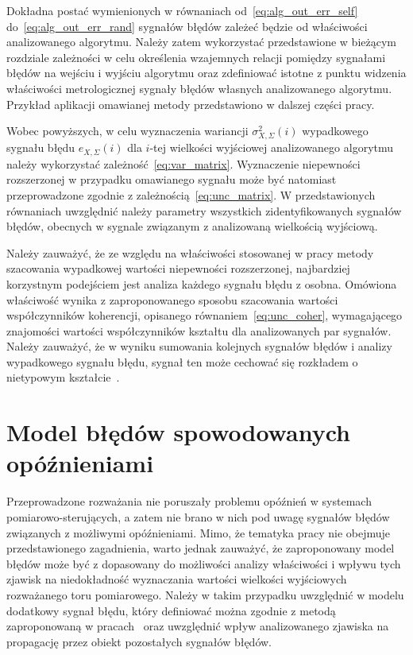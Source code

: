 Dokładna postać wymienionych w równaniach od~\eqref{eq:alg_out_err_self} do~\eqref{eq:alg_out_err_rand} sygnałów błędów zależeć będzie od właściwości analizowanego algorytmu. Należy zatem wykorzystać przedstawione w bieżącym rozdziale zależności w celu określenia wzajemnych relacji pomiędzy sygnałami błędów na wejściu i wyjściu algorytmu oraz zdefiniować istotne z punktu widzenia właściwości metrologicznej sygnały błędów własnych analizowanego algorytmu. Przykład aplikacji omawianej metody przedstawiono w dalszej części pracy.

Wobec powyższych, w celu wyznaczenia wariancji $\sigma_{X,\Sigma}^{2}(i)$ wypadkowego sygnału błędu $e_{X,\Sigma}(i)$ dla $i$-tej wielkości wyjściowej analizowanego algorytmu należy wykorzystać zależność~\eqref{eq:var_matrix}. Wyznaczenie niepewności rozszerzonej w przypadku omawianego sygnału może być natomiast przeprowadzone zgodnie z zależnością~\eqref{eq:unc_matrix}. W przedstawionych równaniach uwzględnić należy parametry wszystkich zidentyfikowanych sygnałów błędów, obecnych w sygnale związanym z analizowaną wielkością wyjściową.

Należy zauważyć, że ze względu na właściwości stosowanej w pracy metody szacowania wypadkowej wartości niepewności rozszerzonej, najbardziej korzystnym podejściem jest analiza każdego sygnału błędu z osobna. Omówiona właściwość wynika z zaproponowanego sposobu szacowania wartości współczynników koherencji, opisanego równaniem~\eqref{eq:unc_coher}, wymagającego znajomości wartości współczynników kształtu dla analizowanych par sygnałów. Należy zauważyć, że w wyniku sumowania kolejnych sygnałów błędów i analizy wypadkowego sygnału błędu, sygnał ten może cechować się rozkładem o nietypowym kształcie~\cite{auth_electronics, zhang_pdp}.

\section{Model błędów spowodowanych opóźnieniami}

Przeprowadzone rozważania nie poruszały problemu opóźnień w systemach pomiarowo-sterujących, a zatem nie brano w nich pod uwagę sygnałów błędów związanych z możliwymi opóźnieniami. Mimo, że tematyka pracy nie obejmuje przedstawionego zagadnienia, warto jednak zauważyć, że zaproponowany model błędów może być z dopasowany do możliwości analizy właściwości i wpływu tych zjawisk na niedokładność wyznaczania wartości wielkości wyjściowych rozważanego toru pomiarowego. Należy w takim przypadku uwzględnić w modelu dodatkowy sygnał błędu, który definiować można zgodnie z metodą zaproponowaną w pracach~\cite{wymyslo_delay, jakubiec_system} oraz uwzględnić wpływ analizowanego zjawiska na propagację przez obiekt pozostałych sygnałów błędów.

